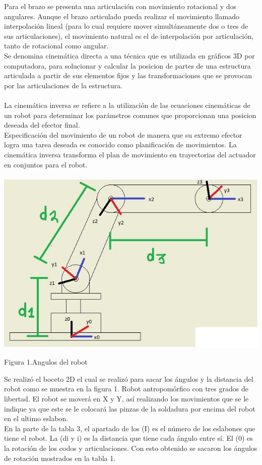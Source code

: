 \documentclass[12pt,letterpaper]{article}
\begin{document}
\newpage


Para el brazo se presenta una articulación con movimiento rotacional y dos angulares. Aunque el brazo articulado pueda realizar el movimiento llamado interpolación lineal (para lo cual requiere mover simultáneamente dos o tres de sus articulaciones), el movimiento natural es el de interpolación por articulación, tanto de rotacional como angular.
\\
Se denomina cinemática directa a una técnica que es utilizada en gráficos 3D por computadora, para solucionar y calcular la posicion de partes de una estructura articulada a partir de sus elementos fijos y las transformaciones que se provocan por las articulaciones de la estructura.
\\\\
La cinemática inversa se refiere a la utilización de las ecuaciones cinemáticas de un robot
para determinar los parámetros comunes que proporcionan una posicion deseada del efector
final.
\\
Especificación del movimiento de un robot de manera que su extremo efector logra una
tarea deseada es conocido como planificación de movimientos. La cinemática inversa transforma el plan de movimiento en trayectorias del actuador en conjuntos para el robot.
\\\\
\includegraphics[scale=1]{imag6.jpg} 
\begin{center}
Figura 1.Angulos del robot
\end{center}
Se realizó el boceto 2D el cual se realizó para sacar los ángulos y la distancia del robot como se muestra en la figura 1.
Robot antropomórfico con tres grados de libertad. El robot se moverá en X y Y, así realizando los movimientos que se le indique ya que este se le colocará las pinzas de la soldadura por encima del robot en el ultimo eslabon.
\\
En la parte de la tabla 3, el apartado de los (I) es el número de los eslabones que tiene el robot. La (di y i) es la distancia que tiene cada ángulo entre sí. El (0) es la rotación de los codos y articulaciones.
Con esto obtenido se sacaron los ángulos de rotación mostrados en la tabla 1.
\end{document}
